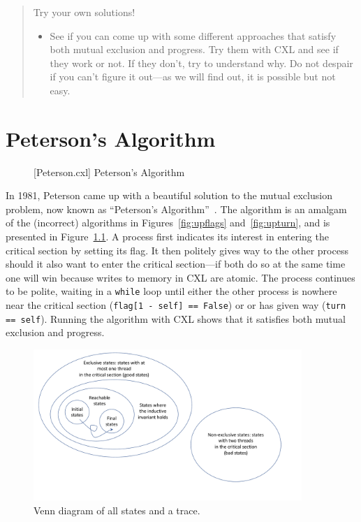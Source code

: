 \documentclass{report}
\newenvironment{code}{
\tcolorbox
}{
\endtcolorbox
}
\begin{document}
\begin{quote}
Try your own solutions!
\begin{itemize}
\item See if you can come up with some different approaches that satisfy both
mutual exclusion and progress.  Try them with CXL and see if they work or not.
If they don't, try to understand why.
Do not despair if you can't figure it out---as
we will find out, it is possible but not easy.
\end{itemize}
\end{quote}

\chapter{Peterson's Algorithm}
\label{ch:peterson}

\begin{figure}
\begin{code}
\end{code}
\caption{[Peterson.cxl] Peterson's Algorithm}
\label{fig:peterson}
\end{figure}

In 1981, Peterson came up with a beautiful solution to the mutual exclusion
problem, now known as ``Peterson's Algorithm''~\cite{Peterson81}.
The algorithm is an amalgam of the (incorrect) algorithms in
Figures~\ref{fig:upflags} and~\ref{fig:upturn}, and is presented
in Figure~\ref{fig:peterson}.
A process first indicates its interest in entering the critical section
by setting its flag.
It then politely gives way to the other process should it also want to
enter the critical section---if both do so at the same time one will
win because writes to memory in CXL are atomic.
The process continues to be polite, waiting in a \texttt{while} loop
until either the other process is nowhere near the critical section
(\texttt{flag[1 - self] == False}) or or has given way
(\texttt{turn == self}).
Running the algorithm with CXL shows that it satisfies both mutual
exclusion and progress.

\begin{figure}
\begin{center}
\includegraphics[width=4in]{figures/states-crop.pdf}
\end{center}
\caption{Venn diagram of all states and a trace.}
\label{fig:states}
\end{figure}
\end{document}
